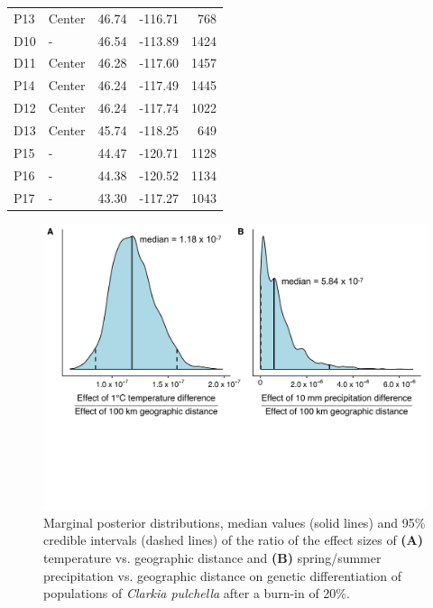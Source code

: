 \documentclass{article}
\begin{document}
\begin{table}[ht]
\begin{tabular}{llrrr}
P13 &	Center  &	46.74 &	-116.71 &	768  \\
D10 &	-       &	46.54 &	-113.89 &	1424 \\
D11 &	Center  &	46.28 &	-117.60 &	1457 \\
P14 &	Center  &	46.24 &	-117.49 &	1445 \\
D12 &	Center  &	46.24 &	-117.74 &	1022 \\
D13 &	Center  &	45.74 &	-118.25 &	649  \\
P15 &	-	      & 44.47 &	-120.71 &	1128 \\
P16 &	-       &	44.38 &	-120.52 &	1134 \\
P17 &	-       &	43.30 &	-117.27 &	1043 \\
\bottomrule
\end{tabular}
\end{table}


\begin{figure}[ht]
\centering
\includegraphics[width=14cm]{figs/bedassle_main.pdf}
\caption[Effect sizes of temperature and precipitation vs. geographic distance]{Marginal posterior distributions, median values (solid lines) and 95\% credible intervals (dashed lines) of the ratio of the effect sizes of \textbf{(A)} temperature vs. geographic distance and \textbf{(B)} spring/summer precipitation vs. geographic distance on genetic differentiation of populations of \textit{Clarkia pulchella} after a burn-in of 20\%.}
\label{bedassle_main}
\end{figure}
\end{document}
